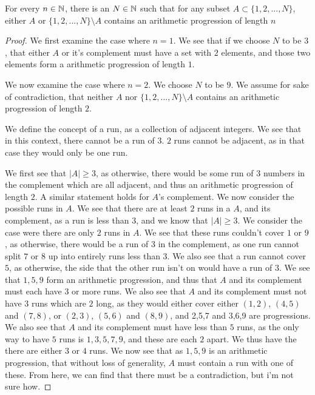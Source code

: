 \begin{majorEx}
  For every $n \in \mathbb{N}$, there is an $N \in \mathbb{N}$ such that for any
  subset $A \subset \{1,2,...,N\}$, either $A$ or $\{1,2,...,N\}
  \setminus A$ contains an arithmetic progression of length $n$
\end{majorEx}

\begin{proof}
  We first examine the case where $n=1$. We see that if we choose $N$
  to be $3$, that either $A$ or it's complement must have a set with
  $2$ elements, and those two elements form a arithmetic progression
  of length $1$.

  We now examine the case where $n=2$. We choose $N$ to
  be $9$. We assume for sake of contradiction, that neither $A$ nor 
  $\{1,2,...,N\} \setminus A$ contains an arithmetic progression 
  of length $2$. 

  We define the concept of a run, as a collection of adjacent
  integers. We see that in this context, there cannot be a run of
  $3$. $2$ runs cannot be adjacent, as in that case they would only be
  one run.

  We first see that $|A|\geq 3$, as otherwise, there
  would be some run of $3$ numbers in the complement which 
  are all adjacent, and thus an
  arithmetic progression of length $2$. A similar statement holds for
  $A$'s complement. We now consider the possible
  runs in $A$. We see that there are at least $2$ runs in a $A$, and
  its complement, as a run is less than $3$, and we know that $|A|\geq
  3$. We consider the case were there are only $2$ runs in $A$. 
  We see that these runs couldn't cover $1$ or $9$, as otherwise,
  there would be a run of $3$ in the complement, as one run cannot
  split $7$ or $8$ up into entirely runs less than $3$. We also see
  that a run cannot cover $5$, as otherwise, the side that the other
  run isn't on would have a run of $3$. We see that $1,5,9$ form an
  arithmetic progression, and thus that $A$ and its complement must
  each have $3$ or more runs. We also see that $A$ and its complement
  must not have $3$ runs which are $2$ long, as they would either
  cover either $(1,2)$, $(4,5)$ and $(7,8)$, or $(2,3)$, $(5,6)$ and
  $(8,9)$, and 2,5,7 and 3,6,9 are progressions. We also see that $A$
  and its complement must have less than $5$ runs, as the only way to
  have $5$ runs is $1,3,5,7,9$, and these are each $2$ apart. We thus
  have the there are either $3$ or $4$ runs. We now see that as
  $1,5,9$ is an arithmetic progression, that without loss of
  generality, $A$ must contain a run with one of these. From here, we
  can find that there must be a contradiction, but i'm not sure how.
\end{proof}


